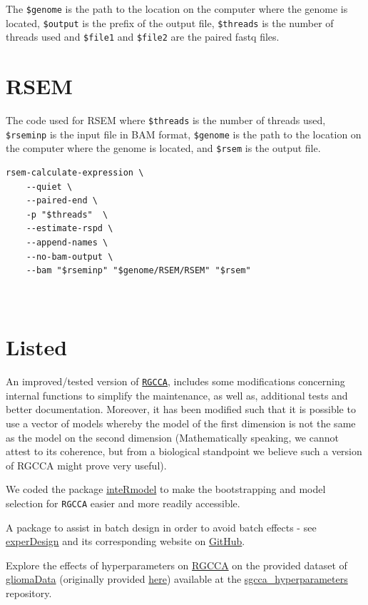 \documentclass[
  12pt,
  a4paper,
  twoside,
  openright]{book}
\begin{document}
The \texttt{\$genome} is the path to the location on the computer where the genome is located, \texttt{\$output} is the prefix of the output file, \texttt{\$threads} is the number of threads used and \texttt{\$file1} and \texttt{\$file2} are the paired fastq files.

\hypertarget{rsem}{%
\section{RSEM}\label{rsem}}

The code used for RSEM where \texttt{\$threads} is the number of threads used, \texttt{\$rseminp} is the input file in BAM format, \texttt{\$genome} is the path to the location on the computer where the genome is located, and \texttt{\$rsem} is the output file.

\begin{verbatim}
rsem-calculate-expression \
    --quiet \
    --paired-end \
    -p "$threads"  \
    --estimate-rspd \
    --append-names \
    --no-bam-output \
    --bam "$rseminp" "$genome/RSEM/RSEM" "$rsem"
    
    
\end{verbatim}

\hypertarget{listed}{%
\section{Listed}\label{listed}}

An improved/tested version of \href{https://github.com/llrs/RGCCA}{\texttt{RGCCA}}, includes some modifications concerning internal functions to simplify the maintenance, as well as, additional tests and better documentation.
Moreover, it has been modified such that it is possible to use a vector of models whereby the model of the first dimension is not the same as the model on the second dimension (Mathematically speaking, we cannot attest to its coherence, but from a biological standpoint we believe such a version of RGCCA might prove very useful).

We coded the package \href{https:github.com/llrs/inteRmodel}{inteRmodel} to make the bootstrapping and model selection for \texttt{RGCCA} easier and more readily accessible.

A package to assist in batch design in order to avoid batch effects - see \href{https://cran.r-project.org/package=experDesign}{experDesign} and its corresponding website on \href{https://github.com/llrs/experDesign}{GitHub}.

Explore the effects of hyperparameters on \protect\hyperlink{acronyms_RGCCA}{RGCCA} on the provided dataset of \href{https://github.com/llrs/gliomaData}{gliomaData} (originally provided \href{http://biodev.cea.fr/sgcca/}{here}) available at the \href{https://github.com/llrs/sgcca_hyperparameters}{sgcca\_hyperparameters} repository.
\end{document}
